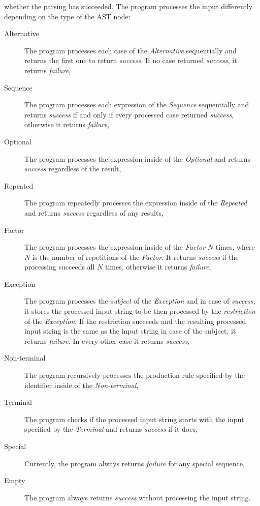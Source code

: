 \documentclass[english,engineering]{wizthesis}
\begin{document}
\noindent whether the parsing has succeeded. The program
processes the input differently depending on the type of the AST node:
\begin{description}
  \item[Alternative] The program processes each case of the \emph{Alternative}
  sequentially and returns the first one to return \emph{success}. If no case
  returned \emph{success}, it returns \emph{failure},
  \item[Sequence] The program processes each expression of the \emph{Sequence}
  sequentially and returns \emph{success} if and only if every processed case
  returned \emph{success}, otherwise it returns \emph{failure},
  \item[Optional] The program processes the expression inside of the
  \emph{Optional} and returns \emph{success} regardless of the result,
  \item[Repeated] The program repeatedly processes the expression inside of the
  \emph{Repeated} and returns \emph{success} regardless of any results,
  \item[Factor] The program processes the expression inside of the \emph{Factor}
  $N$ times, where $N$ is the number of repetitions of the \emph{Factor}. It
  returns \emph{success} if the processing succeeds all $N$ times, otherwise it
  returns \emph{failure},
  \item[Exception] The program processes the \emph{subject} of the
  \emph{Exception} and in case of \emph{success}, it stores the processed input
  string to be then processed by the \emph{restriction} of the \emph{Exception}.
  If the restriction succeeds and the resulting processed input string is the
  same as the input string in case of the subject, it returns \emph{failure}.
  In every other case it returns \emph{success},
  \item[Non-terminal] The program recursively processes the production rule
  specified by the identifier inside of the \emph{Non-terminal},
  \item[Terminal] The program checks if the processed input string starts with
  the input specified by the \emph{Terminal} and returns \emph{success} if it
  does,
  \item[Special] Currently, the program always returns \emph{failure} for any
  special sequence,
  \item[Empty] The program always returns \emph{success} without processing the
  input string.
\end{description}
\end{document}
